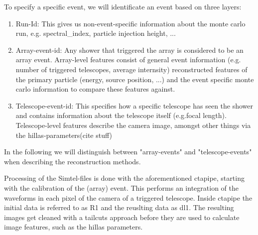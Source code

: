To specify a specific event, we will identificate an event based on 
three layers:
\begin{enumerate}
    \item{Run-Id: This gives us non-event-specific information about the monte carlo run, e.g.
    spectral\_index, particle injection height, ...}
    \item{Array-event-id: Any shower that triggered the array is considered to be an array event.
    Array-level features consist of general event information (e.g. number of triggered telescopes, average internsity)
    reconstructed features of the primary particle (energy, source position, ...) and the 
    event specific monte carlo information to compare these features against.}
    \item{Telescope-event-id: This specifies how a specific telescope has seen the shower and
    contains information about the telescope itself (e.g.focal length). Telescope-level features 
    describe the camera image, amongst other things via the hillas-parameters(cite stuff)}
\end{enumerate}


In the following we will 
distinguish between "array-events" and "telescope-events" when describing the reconstruction methods.

Processing of the Simtel-files is done with the aforementioned ctapipe, starting with 
the calibration of the (array) event. This performs an integration of the waveforms in 
each pixel of the camera of a triggered telescope. Inside ctapipe the initial data is referred to as R1
and the reuslting data as dl1. The resulting images get cleaned with a tailcuts approach before they are
used to calculate image features, such as the hillas parameters.

